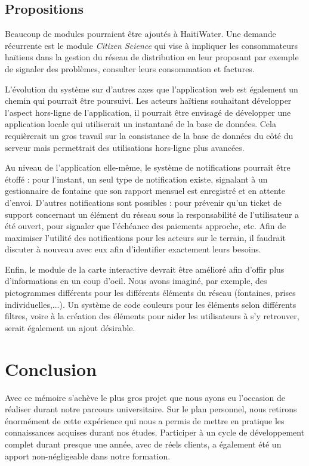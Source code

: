 \documentclass{EPL-master-thesis-covers-FR}
\begin{document}
		\section{Propositions}

			Beaucoup de modules pourraient être ajoutés à HaïtiWater. Une demande récurrente est le module \emph{Citizen Science} qui vise à impliquer les consommateurs haïtiens dans la gestion du réseau de distribution en leur proposant par exemple de signaler des problèmes, consulter leurs consommation et factures.

			L'évolution du système sur d'autres axes que l'application web est également un chemin qui pourrait être poursuivi. Les acteurs haïtiens souhaitant développer l'aspect hors-ligne de l'application, il pourrait être envisagé de développer une application locale qui utiliserait un instantané de la base de données. Cela requièrerait un gros travail sur la consistance de la base de données du côté du serveur mais permettrait des utilisations hors-ligne plus avancées.

			Au niveau de l'application elle-même, le système de notifications pourrait être étoffé : pour l'instant, un seul type de notification existe, signalant à un gestionnaire de fontaine que son rapport mensuel est enregistré et en attente d'envoi. D'autres notifications sont possibles : pour prévenir qu'un ticket de support concernant un élément du réseau sous la responsabilité de l'utilisateur a été ouvert, pour signaler que l'échéance des paiements approche, etc. Afin de maximiser l'utilité des notifications pour les acteurs sur le terrain, il faudrait discuter à nouveau avec eux afin d'identifier exactement leurs besoins.

			Enfin, le module de la carte interactive devrait être amélioré afin d'offir plus d'informations en un coup d'oeil. Nous avons imaginé, par exemple, des pictogrammes différents pour les différents éléments du réseau (fontaines, prises individuelles,...). Un système de code couleurs pour les éléments selon différents filtres, voire à la création des éléments pour aider les utilisateurs à s'y retrouver, serait également un ajout désirable.

	\chapter{Conclusion}

		Avec ce mémoire s'achève le plus gros projet que nous ayons eu l'occasion de réaliser durant notre parcours universitaire. Sur le plan personnel, nous retirons énormément de cette expérience qui nous a permis de mettre en pratique les connaissances acquises durant nos études. Participer à un cycle de développement complet durant presque une année, avec de réels clients, a également été un apport non-négligeable dans notre formation.
\end{document}
